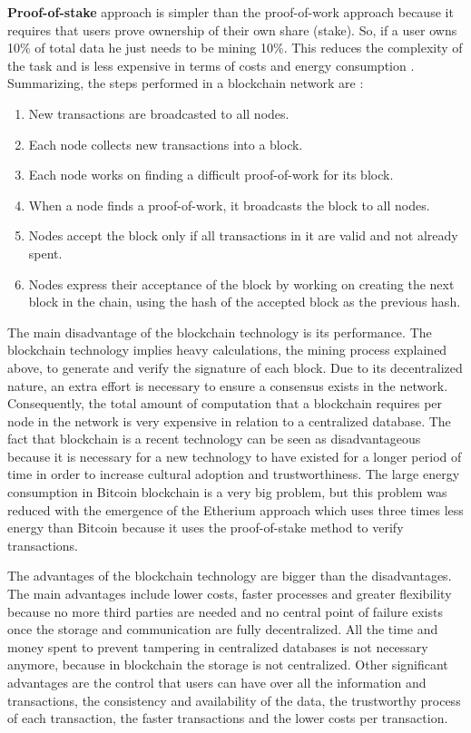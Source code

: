 \textbf{Proof-of-stake} approach is simpler than the proof-of-work approach because it requires that users prove ownership of their own share (stake). So, if a user owns 10\% of total data he just needs to be mining 10\%. This reduces the complexity of the task and is less expensive in terms of costs and energy consumption \cite{etherium}.
Summarizing, the steps performed in a blockchain network are \cite{bitcoin}: 

\begin{enumerate}
    \item New transactions are broadcasted to all nodes. 
    \item Each node collects new transactions into a block. 
    \item Each node works on finding a difficult proof-of-work for its block. 
    \item When a node finds a proof-of-work, it broadcasts the block to all nodes. 
    \item Nodes accept the block only if all transactions in it are valid and not already spent. 
    \item Nodes express their acceptance of the block by working on creating the next block in the chain, using the hash of the accepted block as the previous hash.
\end{enumerate}


The main disadvantage of the blockchain technology is its performance. The blockchain technology implies heavy calculations, the mining process explained above, to generate and verify the signature of each block. Due to its decentralized nature, an extra effort is necessary to ensure a consensus exists in the network. Consequently, the total amount of computation that a blockchain requires per node in the network is very expensive in relation to a centralized database. The fact that blockchain is a recent technology can be seen as disadvantageous because it is necessary for a new technology to have existed for a longer period of time in order to increase cultural adoption and trustworthiness. The large energy consumption in Bitcoin blockchain is a very big problem, but this problem was reduced with the emergence of the Etherium approach which uses three times less energy than Bitcoin because it uses the proof-of-stake method to verify transactions.


The advantages of the blockchain technology are bigger than the disadvantages. The main advantages include lower costs, faster processes and greater flexibility because no more third parties are needed and no central point of failure exists once the storage and communication are fully decentralized. All the time and money spent to prevent tampering in centralized databases is not necessary anymore, because in blockchain the storage is not centralized. Other significant advantages are the control that users can have over all the information and transactions, the consistency and availability of the data, the trustworthy process of each transaction, the faster transactions and the lower costs per transaction.


